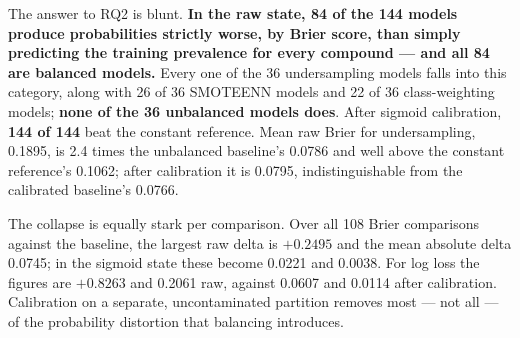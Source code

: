 \documentclass[10pt,letterpaper]{article}
\begin{document}
The answer to RQ2 is blunt. \textbf{In the raw state, 84 of the 144 models produce probabilities
strictly worse, by Brier score, than simply predicting the training prevalence for every compound ---
and all 84 are balanced models.} Every one of the 36 undersampling models falls into this category,
along with 26 of 36 SMOTEENN models and 22 of 36 class-weighting models; \textbf{none of the 36
unbalanced models does}. After sigmoid calibration, \textbf{144 of 144} beat the constant reference.
Mean raw Brier for undersampling, 0.1895, is 2.4 times the unbalanced baseline's 0.0786 and well
above the constant reference's 0.1062; after calibration it is 0.0795, indistinguishable from the
calibrated baseline's 0.0766.

The collapse is equally stark per comparison. Over all 108 Brier comparisons against the baseline,
the largest raw delta is $+0.2495$ and the mean absolute delta 0.0745; in the sigmoid state these
become 0.0221 and 0.0038. For log loss the figures are $+0.8263$ and 0.2061 raw, against 0.0607 and
0.0114 after calibration. Calibration on a separate, uncontaminated partition removes most --- not
all --- of the probability distortion that balancing introduces.
\end{document}
